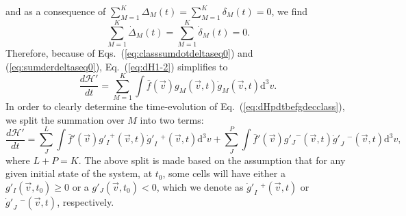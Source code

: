 %
and as a consequence of $\sum_{M=1}^{K} \Delta_M(t) =\sum_{M=1}^{K} \delta_M(t) =0$,
we find
%
\begin{equation}\label{eq:sumderdeltaseq0}
    \sum_{M=1}^{K} \dot{\Delta}_M(t)  =\sum_{M=1}^{K} \dot{\delta}_{M}(t) =0.
\end{equation}
%
Therefore, because of
Eqs.~(\ref{eq:classsumdotdeltaseq0}) and (\ref{eq:sumderdeltaseq0}), Eq.~(\ref{eq:dH1-2}) simplifies to
%
\begin{equation}\label{eq:dHpdtbefgdecclass}
  \frac{d\mathcal{H}'}{dt} = \sum_{M=1}^{K}\int\bar f(\vec{v})g_M(\vec{v},t)\dot g_M(\vec{v},t)\mathrm{d}^3v.
\end{equation}
%
In order to clearly determine the time-evolution of Eq.~(\ref{eq:dHpdtbefgdecclass}),
we split the summation over $M$ into two terms:
%
\begin{equation}\label{eq:classicalH3}
    \frac{d\mathcal{H}'}{dt}=\sum_J^{L}\int
      \bar f'(\vec{v}){g'_I}^{+}(\vec{v},t){{\dot{g}}'}_I\phantom{.}\!^{+}(\vec{v},t)\mathrm{d}^3v
        +\sum_J^{P}\int
      \bar f'(\vec{v}){g'_J}^{-}(\vec{v},t){{\dot{g}}'}_J\phantom{.}\!^{-}(\vec{v},t)\mathrm{d}^3v,
\end{equation}
%
where $L+P=K$. The above split is made based on the assumption that for any given initial
state of the system, at $t_0$, some cells will have either a $g'_I(\vec{v},t_0)\geq0$
or a $g'_J(\vec{v},t_0)<0$,
which we denote as ${{\dot{g}}'}_I\phantom{.}\!^{+}(\vec{v},t)$
or ${{\dot{g}}'}_J\phantom{.}\!^{-}(\vec{v},t)$, respectively.
%
